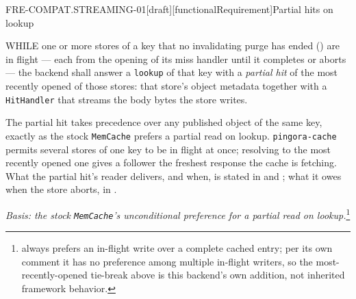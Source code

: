 \begin{requirement}{FRE-COMPAT.STREAMING-01}[draft][functionalRequirement]{Partial hits on lookup}


  WHILE one or more stores of a key that no invalidating purge has ended
  () are in flight --- each from the opening
  of its miss handler until it completes or aborts --- the backend shall
  answer a \texttt{lookup} of that key with a \emph{partial hit} of the most
  recently opened of those stores: that store's object metadata together with a
  \texttt{HitHandler} that streams the body bytes the store writes.

  The partial hit takes precedence over any published object of the same key,
  exactly as the stock \texttt{MemCache} prefers a partial read on lookup.
  \texttt{pingora-cache} permits several stores of one key to be in flight at
  once; resolving to the most recently opened one gives a follower the
  freshest response the cache is fetching. What the partial hit's reader
  delivers, and when, is stated in  and
  ; what it owes when the store aborts, in
  .

  \textit{Basis: the stock \texttt{MemCache}'s unconditional preference for a
  partial read on
  lookup.}\footnote{
  always prefers an in-flight write over a complete cached entry; per its own
  comment it has no preference among multiple in-flight writers, so the
  most-recently-opened tie-break above is this backend's own addition, not
  inherited framework behavior.}



\end{requirement}

